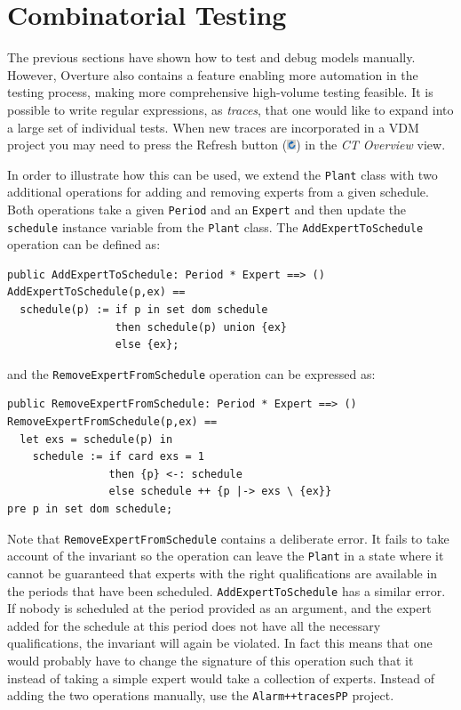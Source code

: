 \newpage

\section{Combinatorial Testing}\label{sec:CT}

The previous sections have shown how to test and debug models
manually. However, Overture also contains a feature enabling more
automation in the testing process, making more comprehensive
high-volume testing feasible. It is possible to write regular
expressions, as \emph{traces}, that one would like to expand into a
large set of individual tests. When new traces are incorporated in a
VDM project you may need to press the \textsf{Refresh} button
(\includegraphics[width=0.02\textwidth]{figures/refresh}) in the
\emph{CT Overview} view.

In order to illustrate how this can be used, we extend the
\texttt{Plant} class with two additional operations for adding and
removing experts from a given schedule. Both operations take a given
\texttt{Period} and an \texttt{Expert} and then update the
\texttt{schedule} instance variable from the \texttt{Plant} class. The
\texttt{AddExpertToSchedule} operation can be defined as:


\begin{lstlisting}
public AddExpertToSchedule: Period * Expert ==> ()
AddExpertToSchedule(p,ex) ==
  schedule(p) := if p in set dom schedule
                 then schedule(p) union {ex}
                 else {ex};
\end{lstlisting}

\noindent and the \texttt{RemoveExpertFromSchedule} operation can
be expressed as:

\begin{lstlisting}
public RemoveExpertFromSchedule: Period * Expert ==> ()
RemoveExpertFromSchedule(p,ex) ==
  let exs = schedule(p) in
    schedule := if card exs = 1
                then {p} <-: schedule
                else schedule ++ {p |-> exs \ {ex}}
pre p in set dom schedule;
\end{lstlisting}

\noindent Note that \texttt{RemoveExpertFromSchedule} contains a
deliberate error. It fails to take account of the invariant so the
operation can leave the \texttt{Plant} in a state where it cannot be
guaranteed that experts with the right qualifications are available in
the periods that have been scheduled. \texttt{AddExpertToSchedule} has
a similar error.  If nobody is scheduled at the period provided as an
argument, and the expert added for the schedule at this period does
not have all the necessary qualifications, the invariant will again be
violated. In fact this means that one would probably have to change
the signature of this operation such that it instead of taking a
simple expert would take a collection of experts. Instead of adding the
two operations manually, use the \texttt{Alarm++tracesPP} project.

